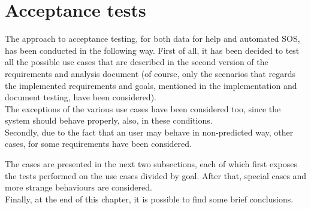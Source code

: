 \section{Acceptance tests}
The approach to acceptance testing, for both data for help and automated SOS, has been
conducted in the following way. 
First of all, it has been decided to test all the possible use cases that are described in the
second version of the requirements and analysis document (of course, only the scenarios that
regards the implemented requirements and goals, mentioned in the implementation and document testing, have been considered). \\
The exceptions of the various use cases have been considered too, since the system should
behave properly, also, in these conditions. \\
Secondly, due to the fact that an user may behave in non-predicted way, other cases, for some
requirements have been considered. 

\par
The cases are presented in the next two subsections, each of which first exposes the
tests performed on the use cases divided by goal. After that, special cases and more strange
behaviours are considered. \\
Finally, at the end of this chapter, it is possible to find some brief conclusions. 




